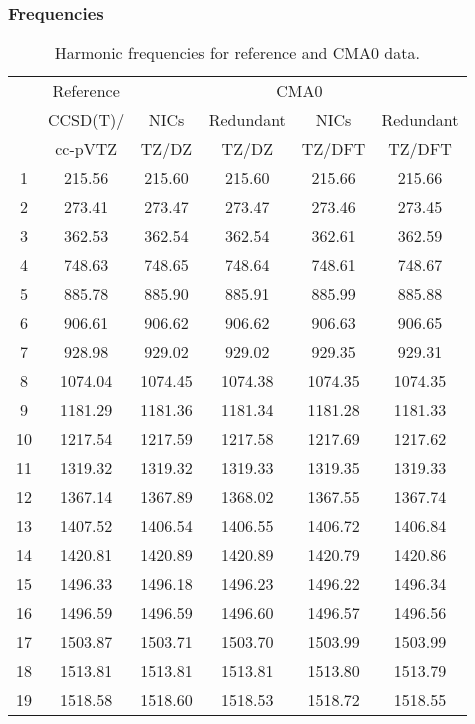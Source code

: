\documentclass[10pt,oneside]{article}
\begin{document}
\begin{table}[h!]
\subsubsection*{Frequencies}
\centering
\caption{Harmonic frequencies for reference and CMA0 data.}
\begin{tabular}{cccccc}
\toprule
{} & Reference & \multicolumn{4}{c}{CMA0} \\
{} &  CCSD(T)/ &    NICs &  Redundant &    NICs & Redundant \\
{} &   cc-pVTZ &   TZ/DZ &      TZ/DZ &  TZ/DFT &    TZ/DFT \\
\midrule
1  &    215.56 &  215.60 &     215.60 &  215.66 &    215.66 \\
2  &    273.41 &  273.47 &     273.47 &  273.46 &    273.45 \\
3  &    362.53 &  362.54 &     362.54 &  362.61 &    362.59 \\
4  &    748.63 &  748.65 &     748.64 &  748.61 &    748.67 \\
5  &    885.78 &  885.90 &     885.91 &  885.99 &    885.88 \\
6  &    906.61 &  906.62 &     906.62 &  906.63 &    906.65 \\
7  &    928.98 &  929.02 &     929.02 &  929.35 &    929.31 \\
8  &   1074.04 & 1074.45 &    1074.38 & 1074.35 &   1074.35 \\
9  &   1181.29 & 1181.36 &    1181.34 & 1181.28 &   1181.33 \\
10 &   1217.54 & 1217.59 &    1217.58 & 1217.69 &   1217.62 \\
11 &   1319.32 & 1319.32 &    1319.33 & 1319.35 &   1319.33 \\
12 &   1367.14 & 1367.89 &    1368.02 & 1367.55 &   1367.74 \\
13 &   1407.52 & 1406.54 &    1406.55 & 1406.72 &   1406.84 \\
14 &   1420.81 & 1420.89 &    1420.89 & 1420.79 &   1420.86 \\
15 &   1496.33 & 1496.18 &    1496.23 & 1496.22 &   1496.34 \\
16 &   1496.59 & 1496.59 &    1496.60 & 1496.57 &   1496.56 \\
17 &   1503.87 & 1503.71 &    1503.70 & 1503.99 &   1503.99 \\
18 &   1513.81 & 1513.81 &    1513.81 & 1513.80 &   1513.79 \\
19 &   1518.58 & 1518.60 &    1518.53 & 1518.72 &   1518.55 \\

\end{tabular}
\end{table}
\end{document}
